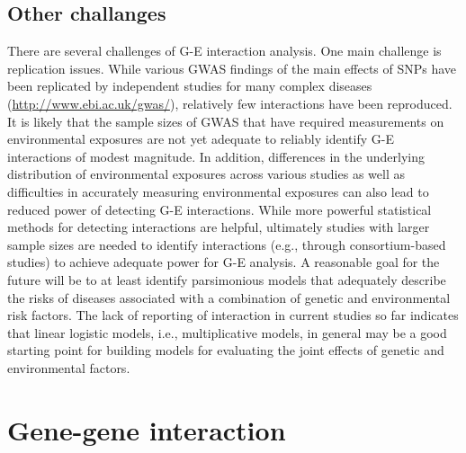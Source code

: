 \documentclass[]{book}
\theoremstyle{definition}
\theoremstyle{definition}
\theoremstyle{definition}
\theoremstyle{remark}
\begin{document}
\section{Other challanges}\label{other-challanges}

There are several challenges of G-E interaction analysis. One main
challenge is replication issues. While various GWAS findings of the main
effects of SNPs have been replicated by independent studies for many
complex diseases (\url{http://www.ebi.ac.uk/gwas/}), relatively few
interactions have been reproduced. It is likely that the sample sizes of
GWAS that have required measurements on environmental exposures are not
yet adequate to reliably identify G-E interactions of modest magnitude.
In addition, differences in the underlying distribution of environmental
exposures across various studies as well as difficulties in accurately
measuring environmental exposures can also lead to reduced power of
detecting G-E interactions. While more powerful statistical methods for
detecting interactions are helpful, ultimately studies with larger
sample sizes are needed to identify interactions (e.g., through
consortium-based studies) to achieve adequate power for G-E analysis. A
reasonable goal for the future will be to at least identify parsimonious
models that adequately describe the risks of diseases associated with a
combination of genetic and environmental risk factors. The lack of
reporting of interaction in current studies so far indicates that linear
logistic models, i.e., multiplicative models, in general may be a good
starting point for building models for evaluating the joint effects of
genetic and environmental factors.

\chapter{Gene-gene interaction}\label{gene-gene-interaction}
\end{document}
